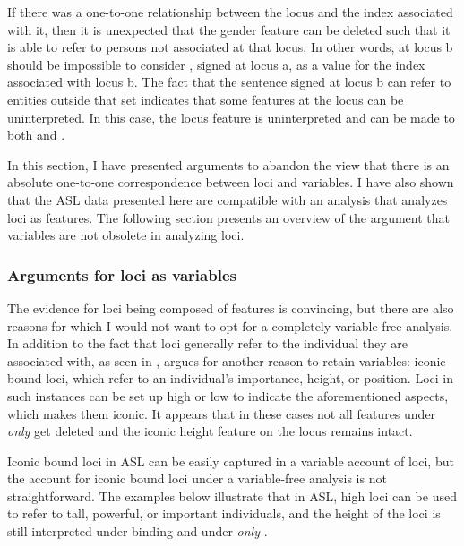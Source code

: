 \documentclass[output=paper,
modfonts
]{langscibook}
\begin{document}
If there was a one-to-one relationship between the locus and the index associated with it, then it is unexpected that the gender feature can be deleted such that it is able to refer to persons not associated at that locus. In other words,  at locus b should be impossible to consider , signed at locus a, as a value for the index associated with locus b. The fact that the sentence signed at locus b can refer to entities outside that set indicates that some features at the locus can be uninterpreted. In this case, the locus feature is uninterpreted and  can be made to both  and . 

In this section, I have presented arguments to abandon the view that there is an absolute one-to-one correspondence between loci and variables. I have also shown that the ASL data presented here are compatible with an analysis that analyzes loci as features. The following section presents an overview of the argument that variables are not obsolete in analyzing loci. 

\subsubsection{Arguments for loci as variables}

The evidence for loci being composed of features is convincing, but there are also reasons for which I would not want to opt for a completely variable-free analysis. In addition to the fact that loci generally refer to the individual they are associated with, as seen in , \citet{Schlenker2014} argues for another reason to retain variables: iconic bound loci, which refer to an individual's importance, height, or position. Loci in such instances can be set up high or low to indicate the aforementioned aspects, which makes them iconic. It appears that in these cases not all features under \textit{only} get deleted and the iconic height feature on the locus remains intact. 

Iconic bound loci in ASL can be easily captured in a variable account of loci, but the account for iconic bound loci under a variable-free analysis is not straightforward. The examples below illustrate that in ASL, high loci can be used to refer to tall, powerful, or important individuals, and the height of the loci is still interpreted under binding and under \textit{only} \citep{Schlenker2014}.\largerpage
\end{document}
